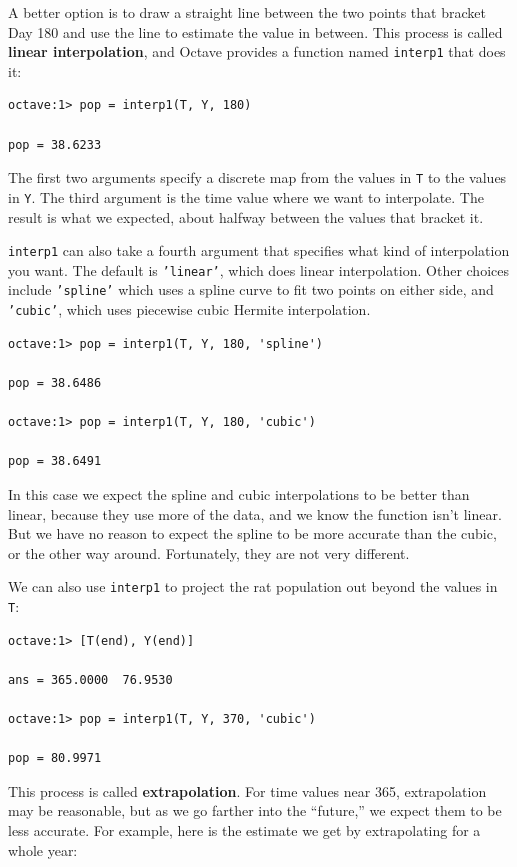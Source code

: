 \documentclass{book}
\begin{document}
A better option is to draw a straight line between the two points that
bracket Day 180 and use the line to estimate the value in between.
This process is called {\bf linear interpolation}, and Octave provides
a function named {\tt interp1} that does it:

\begin{verbatim}
octave:1> pop = interp1(T, Y, 180)

pop = 38.6233
\end{verbatim}

The first two arguments specify a discrete map from the values in
{\tt T} to the values in {\tt Y}. The third argument is the
time value where we want to interpolate. The result is what
we expected, about halfway between the values that bracket it.

{\tt interp1} can also take a fourth argument that specifies what
kind of interpolation you want. The default is {\tt 'linear'}, which
does linear interpolation. Other choices include {\tt 'spline'}
which uses a spline curve to fit two points on either side,
and {\tt 'cubic'}, which uses piecewise cubic Hermite interpolation.

\begin{verbatim}
octave:1> pop = interp1(T, Y, 180, 'spline')

pop = 38.6486

octave:1> pop = interp1(T, Y, 180, 'cubic')

pop = 38.6491
\end{verbatim}

In this case we expect the spline and cubic interpolations to be
better than linear, because they use more of the data, and we know the
function isn't linear. But we have no reason to expect the spline to
be more accurate than the cubic, or the other way around.
Fortunately, they are not very different.

We can also use {\tt interp1} to project the rat population out
beyond the values in {\tt T}:

\begin{verbatim}
octave:1> [T(end), Y(end)]

ans = 365.0000  76.9530

octave:1> pop = interp1(T, Y, 370, 'cubic')

pop = 80.9971
\end{verbatim}

This process is called {\bf extrapolation}. For time values near
365, extrapolation may be reasonable, but as we go farther into
the ``future,'' we expect them to be less accurate.
For example, here is the estimate we get by extrapolating for a whole
year:
\end{document}
